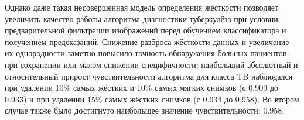 Однако даже такая несовершенная модель определения жёсткости позволяет увеличить качество работы алгоритма диагностики туберкулёза при условии предварительной фильтрации изображений перед обучением классификатора и получением предсказаний. Снижение разброса жёсткости данных и увеличение их однородности заметно повысило точность обнаружения больных пациентов при сохранении или малом снижении специфичности: наибольший абсолютный и относительный прирост чувствительности алгоритма для класса TB наблюдался при удалении 10\% самых жёстких и 10\% самых мягких снимков (с 0.909 до 0.933) и при удалении 15\% самых жёстких снимков (с 0.934 до 0.958). Во втором случае также было достигнуто наибольшее значение чувствительности: 0.958.

\FloatBarrier 
